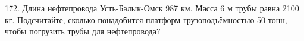 172. Длина нефтепровода Усть-Балык-Омск 987 км. Масса 6 м трубы равна 2100 кг. Подсчитайте, сколько понадобится платформ грузоподъёмностью 50 тонн, чтобы погрузить трубы для нефтепровода?\\
